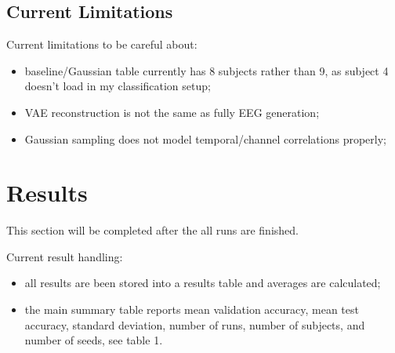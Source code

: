 \documentclass[conference]{IEEEtran}
\begin{document}
\vspace{0.5em}

\subsection{Current Limitations}

Current limitations to be careful about:

\begin{itemize}
\item baseline/Gaussian table currently has 8 subjects rather than 9, as subject 4 doesn't load in my classification setup;
\item VAE reconstruction is not the same as fully EEG generation;
\item Gaussian sampling does not model temporal/channel correlations properly;
\end{itemize}

\vspace{1em}

\section{Results}

This section will be completed after the all runs are finished.

\vspace{0.5em}

Current result handling:

\begin{itemize}
\item all results are been stored into a results table and averages are calculated;
\item the main summary table reports mean validation accuracy, mean test accuracy, standard deviation, number of runs, number of subjects, and number of seeds, see table 1.
\end{itemize}
\end{document}
